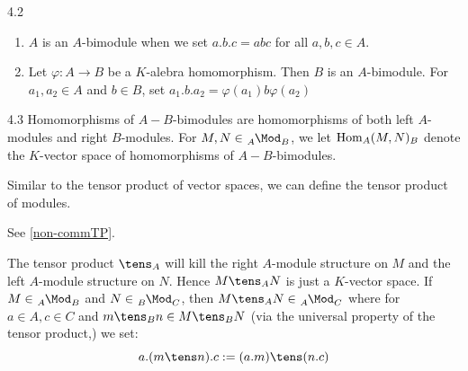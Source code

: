 \documentclass[twoside = false,	%
		headsepline,		%
		parskip = true,
		]{scrbook}						%
\begin{document}
    \begin{example}{}{4.2}
        \begin{enumerate}
            \item $A$ is an $A$-bimodule when we set $a.b.c = abc$ for all $a,b,c \in A$.
            \item Let $\varphi: A \to B$ be a $K$-alebra homomorphism. Then $B$ is an $A$-bimodule. For $a_1,a_2 \in A$ and $b \in B$, set $a_1 . b . a_2 = \varphi(a_1) b \varphi(a_2)$
        \end{enumerate}
    \end{example}

    \begin{definition}{}{4.3}
        Homomorphisms of $A-B$-bimodules are homomorphisms of both left $A$-modules and right $B$-modules. For $M,N \in \tensor[_A]{\Mod}{_B}$, we let $\mathrm{Hom}_A(M,N)_B$ denote the $K$-vector space of homomorphisms of $A-B$-bimodules.
    \end{definition}

    Similar to the tensor product of vector spaces, we can define the tensor product of modules.

    \begin{definition}{}{}
        See \ref{non-commTP}.
    \end{definition}

    The tensor product $\tens_A$ will kill the right $A$-module structure on $M$ and the left $A$-module structure on $N$. Hence $M \tens_A N$ is just a $K$-vector space. If $M \in \tensor[_A]{\Mod}{_B}$ and $N \in \tensor[_B]{\Mod}{_C}$, then $M \tens_A N \in \tensor[_A]{\Mod}{_C}$ where for $a \in A, c \in C$ and $m \tens_B n \in M \tens_B N$ (via the universal property of the tensor product,) we set:
    \begin{equation*}
        a.(m \tens n).c := (a.m) \tens (n.c)
    \end{equation*}
\end{document}
